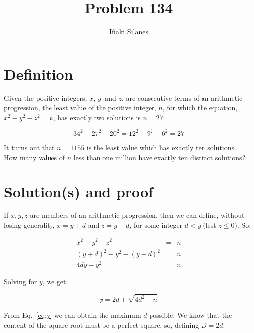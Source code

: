 \documentclass[english]{article}
\begin{document}
\newcommand{\mc}{\multicolumn}
\newcommand{\mr}{\multirow}
\newcommand{\cw}{\columnwidth}
\newcommand{\ig}[2]{\texttt{[image: \#2]}}

\title{Problem 134}
\author{I\~naki Silanes}
\maketitle

\section{Definition}

Given the positive integers, $x$, $y$, and $z$, are consecutive terms of an arithmetic progression, the least value of the positive integer, $n$, for which the equation, $x^2 - y^2 - z^2 = n$, has exactly two solutions is $n = 27$:

\begin{equation}
34^2 - 27^2 - 20^2 = 12^2 - 9^2 - 6^2 = 27
\end{equation}

It turns out that $n = 1155$ is the least value which has exactly ten solutions.\\

How many values of $n$ less than one million have exactly ten distinct solutions?

\section{Solution(s) and proof}

If ${x,y,z}$ are members of an arithmetic progression, then we can define, without losing generality, $x = y + d$ and $z = y - d$, for some integer $d < y$ (lest $z \leq 0$). So:

\begin{eqnarray}
x^2 - y^2 - z^2 & = & n \\
(y+d)^2 - y^2 - (y-d)^2 & = & n \\
4 d y - y^2 & = & n \label{eq:n}
\end{eqnarray}

Solving for $y$, we get:

\begin{equation}
y = 2d \pm \sqrt{4d^2-n} \label{eq:y}
\end{equation}

From Eq.~\ref{eq:y} we can obtain the maximum $d$ possible. We know that the content of the square root must be a perfect square, so, defining $D = 2d$:
\end{document}
